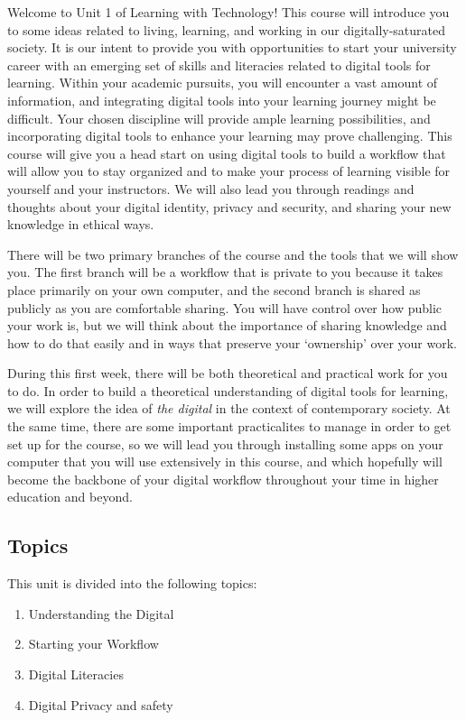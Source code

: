 \documentclass[
]{book}
\providecommand{\tightlist}{%
  \setlength{\itemsep}{0pt}\setlength{\parskip}{0pt}}
\theoremstyle{definition}
\theoremstyle{definition}
\theoremstyle{definition}
\theoremstyle{definition}
\theoremstyle{remark}
\begin{document}
Welcome to Unit 1 of Learning with Technology! This course will introduce you to some ideas related to living, learning, and working in our digitally-saturated society. It is our intent to provide you with opportunities to start your university career with an emerging set of skills and literacies related to digital tools for learning. Within your academic pursuits, you will encounter a vast amount of information, and integrating digital tools into your learning journey might be difficult. Your chosen discipline will provide ample learning possibilities, and incorporating digital tools to enhance your learning may prove challenging. This course will give you a head start on using digital tools to build a workflow that will allow you to stay organized and to make your process of learning visible for yourself and your instructors. We will also lead you through readings and thoughts about your digital identity, privacy and security, and sharing your new knowledge in ethical ways.

There will be two primary branches of the course and the tools that we will show you. The first branch will be a workflow that is private to you because it takes place primarily on your own computer, and the second branch is shared as publicly as you are comfortable sharing. You will have control over how public your work is, but we will think about the importance of sharing knowledge and how to do that easily and in ways that preserve your `ownership' over your work.

During this first week, there will be both theoretical and practical work for you to do. In order to build a theoretical understanding of digital tools for learning, we will explore the idea of \emph{the digital} in the context of contemporary society. At the same time, there are some important practicalites to manage in order to get set up for the course, so we will lead you through installing some apps on your computer that you will use extensively in this course, and which hopefully will become the backbone of your digital workflow throughout your time in higher education and beyond.

\hypertarget{topics}{%
\subsection*{Topics}\label{topics}}

This unit is divided into the following topics:

\begin{enumerate}
\def\labelenumi{\arabic{enumi}.}
\tightlist
\item
  Understanding the Digital\\
\item
  Starting your Workflow\\
\item
  Digital Literacies\\
\item
  Digital Privacy and safety
\end{enumerate}
\end{document}
